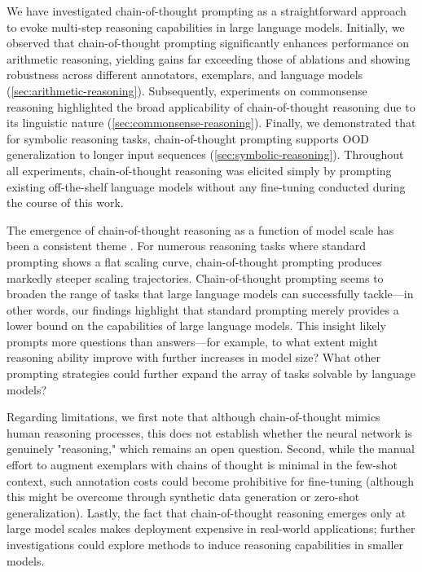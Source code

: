 We have investigated chain-of-thought prompting as a straightforward approach to evoke multi-step reasoning capabilities in large language models. Initially, we observed that chain-of-thought prompting significantly enhances performance on arithmetic reasoning, yielding gains far exceeding those of ablations and showing robustness across different annotators, exemplars, and language models (\cref{sec:arithmetic-reasoning}). Subsequently, experiments on commonsense reasoning highlighted the broad applicability of chain-of-thought reasoning due to its linguistic nature (\cref{sec:commonsense-reasoning}). Finally, we demonstrated that for symbolic reasoning tasks, chain-of-thought prompting supports OOD generalization to longer input sequences (\cref{sec:symbolic-reasoning}). Throughout all experiments, chain-of-thought reasoning was elicited simply by prompting existing off-the-shelf language models without any fine-tuning conducted during the course of this work.

The emergence of chain-of-thought reasoning as a function of model scale has been a consistent theme \citep{wei2022emergent}. For numerous reasoning tasks where standard prompting shows a flat scaling curve, chain-of-thought prompting produces markedly steeper scaling trajectories. Chain-of-thought prompting seems to broaden the range of tasks that large language models can successfully tackle—in other words, our findings highlight that standard prompting merely provides a lower bound on the capabilities of large language models. This insight likely prompts more questions than answers—for example, to what extent might reasoning ability improve with further increases in model size? What other prompting strategies could further expand the array of tasks solvable by language models?

Regarding limitations, we first note that although chain-of-thought mimics human reasoning processes, this does not establish whether the neural network is genuinely "reasoning," which remains an open question. Second, while the manual effort to augment exemplars with chains of thought is minimal in the few-shot context, such annotation costs could become prohibitive for fine-tuning (although this might be overcome through synthetic data generation or zero-shot generalization).  Lastly, the fact that chain-of-thought reasoning emerges only at large model scales makes deployment expensive in real-world applications; further investigations could explore methods to induce reasoning capabilities in smaller models.

